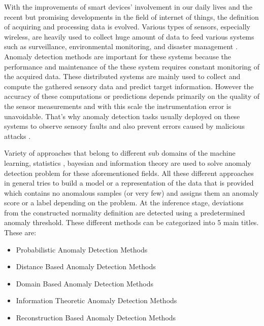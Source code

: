 With the improvements of smart devices' involvement in our daily lives and the recent but promising developments
in the field of internet of things, the definition of acquiring and processing data is evolved.
Various types of sensors, especially wireless, are heavily used to collect huge amount of data to
feed various systems such as surveillance, environmental monitoring, and disaster management
\cite{UlIslam2018}. Anomaly detection methods are important for these systems because the performance and 
maintenance of the these system requires constant monitoring of the acquired data. These distributed 
systems are mainly used to collect and compute the gathered sensory data and predict target information. 
However the accuracy of these computations or predictions depends
primarily on the quality of the sensor measurements and with this scale the instrumentation error
is unavoidable. That's why anomaly detection tasks usually deployed on these systems to observe
sensory faults and also prevent errors caused by malicious attacks \cite{Pimentel:2014:RRN:2588908.2589196} \cite{iot_anomaly}.

Variety of approaches that belong to different sub domains of the machine learning, statistics ,
bayesian and information theory are used to solve anomaly detection problem for these aforementioned
fields. All these different approaches in general tries to build a model or a representation of the
data that is provided which contains no anomalous samples (or very few) and assigns 
them an anomaly score or a label depending on the problem. At the inference stage, deviations from the constructed normality
definition are detected using a predetermined anomaly threshold. These different methods can be
categorized into 5 main titles. These are:

\begin{itemize}
  \item Probabilistic Anomaly Detection Methods
  \item Distance Based Anomaly Detection Methods
  \item Domain Based Anomaly Detection Methods
  \item Information Theoretic Anomaly Detection Methods
  \item Reconstruction Based Anomaly Detection Methods  
\end{itemize}

